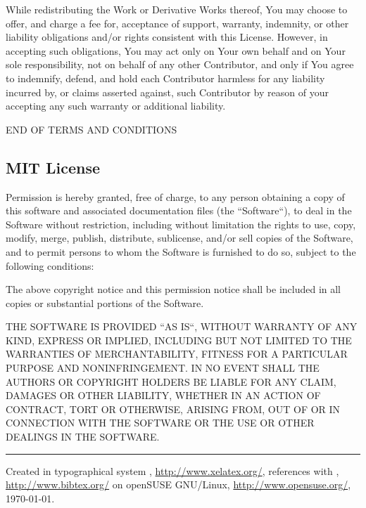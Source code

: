 \documentclass[a4paper, 11pt, twoside]{article}
\begin{document}
While redistributing the Work or Derivative Works thereof, You may choose to offer, and charge a fee for, acceptance of support, warranty, indemnity, or other liability obligations and/or rights consistent with this License. However, in accepting such obligations, You may act only on Your own behalf and on Your sole responsibility, not on behalf of any other Contributor, and only if You agree to indemnify, defend, and hold each Contributor harmless for any liability incurred by, or claims asserted against, such Contributor by reason of your accepting any such warranty or additional liability.

END OF TERMS AND CONDITIONS

\subsection{MIT License}

Permission is hereby granted, free of charge, to any person obtaining a copy of this software and associated documentation files (the “Software“), to deal in the Software without restriction, including without limitation the rights to use, copy, modify, merge, publish, distribute, sublicense, and/or sell copies of the Software, and to permit persons to whom the Software is furnished to do so, subject to the following conditions:

The above copyright notice and this permission notice shall be included in all copies or substantial portions of the Software.

THE SOFTWARE IS PROVIDED “AS IS“, WITHOUT WARRANTY OF ANY KIND, EXPRESS OR IMPLIED, INCLUDING BUT NOT LIMITED TO THE WARRANTIES OF MERCHANTABILITY, FITNESS FOR A PARTICULAR PURPOSE AND NONINFRINGEMENT. IN NO EVENT SHALL THE AUTHORS OR COPYRIGHT HOLDERS BE LIABLE FOR ANY CLAIM, DAMAGES OR OTHER LIABILITY, WHETHER IN AN ACTION OF CONTRACT, TORT OR OTHERWISE, ARISING FROM, OUT OF OR IN CONNECTION WITH THE SOFTWARE OR THE USE OR OTHER DEALINGS IN THE SOFTWARE.

\endgroup



\vfill
\hrule
\vfill
Created in typographical system \XeLaTeX, \href{http://www.xelatex.org/}{http://www.xelatex.org/}, references with \BibTeX, \href{http://www.bibtex.org/}{http://www.bibtex.org/} on openSUSE GNU/Linux, \href{http://www.opensuse.org/}{http://www.opensuse.org/}, \today.
\end{document}
